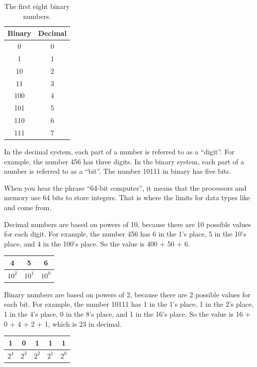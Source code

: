 \begin{table}[!ht]
\begin{center}
\begin{tabular}{|c|c|}
\hline
Binary & Decimal \\
\hline
0 & 0 \\
\hline
1 & 1 \\
\hline
10 & 2 \\
\hline
11 & 3 \\
\hline
100 & 4 \\
\hline
101 & 5 \\
\hline
110 & 6 \\
\hline
111 & 7 \\
\hline
\end{tabular}
\caption{The first eight binary numbers.}
\label{tab:binary}
\end{center}
\end{table}

In the decimal system, each part of a number is referred to as a ``digit''.
For example, the number 456 has three digits.
In the binary system, each part of a number is referred to as a ``bit''.
The number 10111 in binary has five bits.

When you hear the phrase ``64-bit computer'', it means that the processors and memory use 64 bits to store integers.
That is where the limits for data types like  and  come from.

Decimal numbers are based on powers of 10, because there are 10 possible values for each digit.
For example, the number 456 has 6 in the 1's place, 5 in the 10's place, and 4 in the 100's place.
So the value is 400 + 50 + 6.

\begin{center}
\begin{tabular}{|c|c|c|}
\hline
4 & 5 & 6 \\
\hline
$10^2$ & $10^1$ & $10^0$ \\
\hline
\end{tabular}
\end{center}

Binary numbers are based on powers of 2, because there are 2 possible values for each bit.
For example, the number 10111 has 1 in the 1's place, 1 in the 2's place, 1 in the 4's place, 0 in the 8's place, and 1 in the 16's place.
So the value is 16 + 0 + 4 + 2 + 1, which is 23 in decimal.

\begin{center}
\begin{tabular}{|c|c|c|c|c|}
\hline
1 & 0 & 1 & 1 & 1 \\
\hline
$2^4$ & $2^3$ & $2^2$ & $2^1$ & $2^0$ \\
\hline
\end{tabular}
\end{center}

